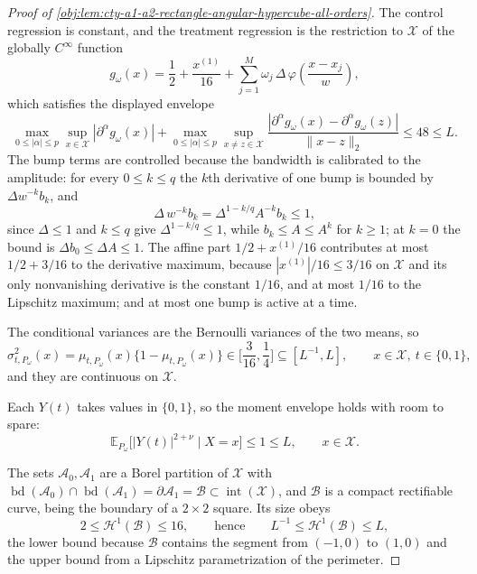 \documentclass[11pt]{article}
\begin{document}
\begin{proof}[Proof of \cref{obj:lem:cty-a1-a2-rectangle-angular-hypercube-all-orders}]
The control regression is constant, and the treatment regression is the restriction to \(\mathcal X\) of the globally \(C^\infty\) function
\[
g_\omega(x)=\frac12+\frac{x^{(1)}}{16}
+\sum_{j=1}^{M}\omega_j\,\Delta\,\varphi\!\left(\frac{x-x_j}{w}\right),
\]
which satisfies the displayed envelope
\[
\max_{0\leq|\alpha|\leq p}\sup_{x\in\mathcal X}|\partial^\alpha g_\omega(x)|
+
\max_{0\leq|\alpha|\leq p}\sup_{x\neq z\in\mathcal X}
\frac{|\partial^\alpha g_\omega(x)-\partial^\alpha g_\omega(z)|}{\lVert x-z\rVert_2}
\leq 48\leq L .
\]
The bump terms are controlled because the bandwidth is calibrated to the amplitude: for every \(0\leq k\leq q\) the \(k\)th derivative of one bump is bounded by \(\Delta w^{-k}b_k\), and
\[
\Delta\,w^{-k}b_k=\Delta^{1-k/q}A^{-k}b_k\leq1,
\]
since \(\Delta\leq1\) and \(k\leq q\) give \(\Delta^{1-k/q}\leq1\), while \(b_k\leq A\leq A^k\) for \(k\geq1\); at \(k=0\) the bound is \(\Delta b_0\leq\Delta A\leq1\).  The affine part \(1/2+x^{(1)}/16\) contributes at most \(1/2+3/16\) to the derivative maximum, because \(|x^{(1)}|/16\leq3/16\) on \(\mathcal X\) and its only nonvanishing derivative is the constant \(1/16\), and at most \(1/16\) to the Lipschitz maximum; and at most one bump is active at a time.

The conditional variances are the Bernoulli variances of the two means, so
\[
\sigma^2_{t,P_\omega}(x)=\mu_{t,P_\omega}(x)\{1-\mu_{t,P_\omega}(x)\}\in\bigl[\frac3{16},\frac14\bigr]
\subseteq[L^{-1},L],
\qquad x\in\mathcal X,\ t\in\{0,1\},
\]
and they are continuous on \(\mathcal X\).

Each \(Y(t)\) takes values in \(\{0,1\}\), so the moment envelope holds with room to spare:
\[
\mathbb E_{P_\omega}\bigl[|Y(t)|^{2+\nu}\mid X=x\bigr]\leq1\leq L,
\qquad x\in\mathcal X .
\]

The sets \(\mathcal A_0,\mathcal A_1\) are a Borel partition of \(\mathcal X\) with \(\operatorname{bd}(\mathcal A_0)\cap\operatorname{bd}(\mathcal A_1)=\partial\mathcal A_1=\mathcal B\subset\operatorname{int}(\mathcal X)\), and \(\mathcal B\) is a compact rectifiable curve, being the boundary of a \(2\times2\) square.  Its size obeys
\[
2\leq\mathcal H^1(\mathcal B)\leq16,
\qquad\text{hence}\qquad
L^{-1}\leq\mathcal H^1(\mathcal B)\leq L,
\]
the lower bound because \(\mathcal B\) contains the segment from \((-1,0)\) to \((1,0)\) and the upper bound from a Lipschitz parametrization of the perimeter.


\end{proof}
\end{document}
